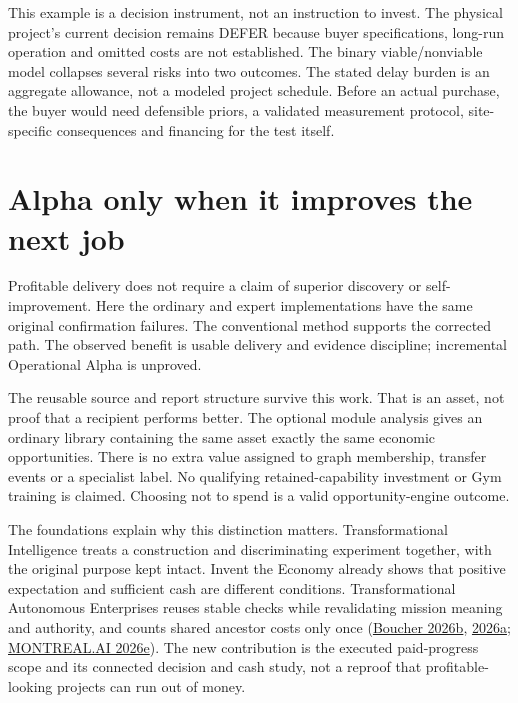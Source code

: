 \documentclass[
  11pt,
  letterpaper,
]{article}
\begin{document}
This example is a decision instrument, not an instruction to invest. The
physical project's current decision remains DEFER because buyer
specifications, long-run operation and omitted costs are not
established. The binary viable/nonviable model collapses several risks
into two outcomes. The stated delay burden is an aggregate allowance,
not a modeled project schedule. Before an actual purchase, the buyer
would need defensible priors, a validated measurement protocol,
site-specific consequences and financing for the test itself.

\hypertarget{alpha-only-when-it-improves-the-next-job}{%
\section{Alpha only when it improves the next
job}\label{alpha-only-when-it-improves-the-next-job}}

Profitable delivery does not require a claim of superior discovery or
self-improvement. Here the ordinary and expert implementations have the
same original confirmation failures. The conventional method supports
the corrected path. The observed benefit is usable delivery and evidence
discipline; incremental Operational Alpha is unproved.

The reusable source and report structure survive this work. That is an
asset, not proof that a recipient performs better. The optional module
analysis gives an ordinary library containing the same asset exactly the
same economic opportunities. There is no extra value assigned to graph
membership, transfer events or a specialist label. No qualifying
retained-capability investment or Gym training is claimed. Choosing not
to spend is a valid opportunity-engine outcome.

The foundations explain why this distinction matters. Transformational
Intelligence treats a construction and discriminating experiment
together, with the original purpose kept intact. Invent the Economy
already shows that positive expectation and sufficient cash are
different conditions. Transformational Autonomous Enterprises reuses
stable checks while revalidating mission meaning and authority, and
counts shared ancestor costs only once
(\protect\hyperlink{ref-transformational}{Boucher 2026b},
\protect\hyperlink{ref-economy}{2026a};
\protect\hyperlink{ref-enterprises}{MONTREAL.AI 2026e}). The new
contribution is the executed paid-progress scope and its connected
decision and cash study, not a reproof that profitable-looking projects
can run out of money.
\end{document}

